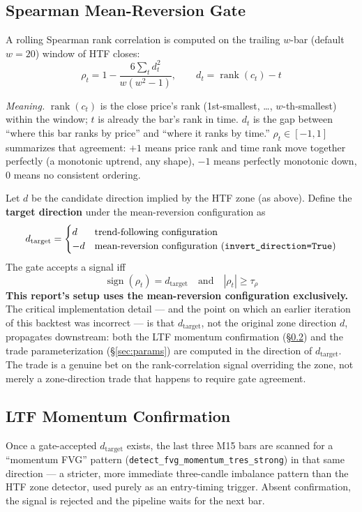 \documentclass[11pt]{article}
\newcommand{\meaningpar}[1]{\par\noindent\textit{Meaning.} #1}
\begin{document}
\subsection{Spearman Mean-Reversion Gate}
A rolling Spearman rank correlation is computed on the trailing $w$-bar (default $w=20$) window of
HTF closes:
\[
\rho_t = 1 - \frac{6\sum_t d_t^2}{w(w^2-1)}, \qquad d_t = \operatorname{rank}(c_t) - t
\]
\meaningpar{$\operatorname{rank}(c_t)$ is the close price's rank (1st-smallest, \dots, $w$-th-smallest)
within the window; $t$ is already the bar's rank in time. $d_t$ is the gap between ``where this bar
ranks by price'' and ``where it ranks by time.'' $\rho_t \in [-1,1]$ summarizes that agreement:
$+1$ means price rank and time rank move together perfectly (a monotonic uptrend, any shape), $-1$
means perfectly monotonic down, $0$ means no consistent ordering.}

Let $d$ be the candidate direction implied by the HTF zone (as above). Define the \textbf{target
direction} under the mean-reversion configuration as
\[
d_{\text{target}} = \begin{cases} d & \text{trend-following configuration} \\ -d &
\text{mean-reversion configuration (\texttt{invert\_direction=True})} \end{cases}
\]
The gate accepts a signal iff
\[
\operatorname{sign}(\rho_t) = d_{\text{target}} \quad \text{and} \quad |\rho_t| \ge \tau_\rho
\]
\textbf{This report's setup uses the mean-reversion configuration exclusively.} The critical
implementation detail --- and the point on which an earlier iteration of this backtest was
incorrect --- is that $d_{\text{target}}$, not the original zone direction $d$, propagates
downstream: both the LTF momentum confirmation (\S\ref{sec:ltf}) and the trade parameterization
(\S\ref{sec:params}) are computed in the direction of $d_{\text{target}}$. The trade is a genuine bet
on the rank-correlation signal overriding the zone, not merely a zone-direction trade that happens to
require gate agreement.

\subsection{LTF Momentum Confirmation}
\label{sec:ltf}
Once a gate-accepted $d_{\text{target}}$ exists, the last three M15 bars are scanned for a
``momentum FVG'' pattern (\texttt{detect\_fvg\_momentum\_tres\_strong}) in that same direction --- a
stricter, more immediate three-candle imbalance pattern than the HTF zone detector, used purely as
an entry-timing trigger. Absent confirmation, the signal is rejected and the pipeline waits for the
next bar.
\end{document}
